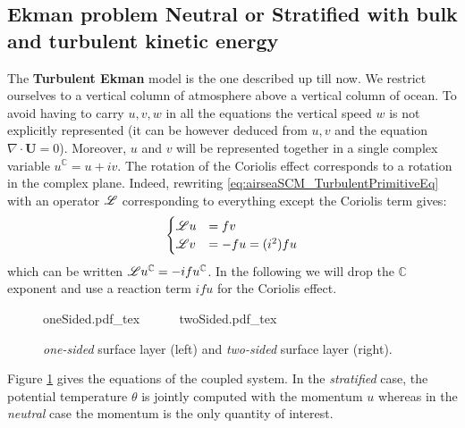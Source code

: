 \subsection{Ekman problem Neutral or Stratified with bulk and turbulent kinetic energy}
\label{sec:airseaSCM_hierarchy_TurbulentEkman}
The \textbf{Turbulent Ekman} model is the one described up till now.
We restrict ourselves to a vertical column of atmosphere
above a vertical column of ocean.
To avoid having to carry $u, v, w$ in all the equations
the vertical speed $w$ is not explicitly represented
(it can be however deduced from $u,v$ and the equation
$\nabla \cdot \mathbf{U}=0$).
Moreover, $u$ and $v$ will be represented together in
a single complex variable $u^{\mathbb{C}} = u+iv$.
The rotation of the Coriolis effect corresponds to
a rotation in the complex plane.
Indeed, rewriting \eqref{eq:airseaSCM_TurbulentPrimitiveEq}
with an operator ${\cal L}$ corresponding to everything except
the Coriolis term gives:
\begin{equation}
	\label{eq:airseaSCM_complexForm}
\begin{cases}
	{\cal L}u &= fv\\
	{\cal L}v &= - fu = (i^2) f u
\end{cases}
\end{equation}
which can be written ${\cal L}u^{\mathbb{C}} = -i f u^\mathbb{C}$.
In the following we will drop the ${\mathbb{C}}$ exponent
and use a reaction term $ifu$ for the Coriolis effect.
\begin{figure}
	\centering
	{oneSided.pdf_tex}
	~~~~~
	{twoSided.pdf_tex}
	\caption{\textit{one-sided} surface layer
	(left) and \textit{two-sided} surface layer (right).
	}
	\label{fig:airseaSCM_twoSidedBulk_drawing}
\end{figure}
Figure \ref{fig:airseaSCM_twoSidedBulk_drawing} gives
the equations of the coupled system. In the \textit{stratified}
case, the potential temperature $\theta$ is jointly computed with the
momentum $u$ whereas in the \textit{neutral} case the momentum
is the only quantity of interest.
